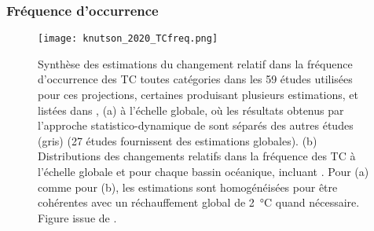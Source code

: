 \documentclass[../main.tex]{subfiles}
\begin{document}
\subsubsection*{Fréquence d'occurrence}

\begin{figure}[htb]
    \centering
    \texttt{[image: knutson\_2020\_TCfreq.png]}
    \caption{Synthèse des estimations du changement relatif dans la fréquence d'occurrence des TC toutes catégories dans les \num{59} études utilisées pour ces
        projections, certaines produisant plusieurs estimations, et listées dans \cite[][documents supplémentaires, tableau ES1]{knutson_tropical_2020}, (a) à
        l'échelle globale, où les résultats obtenus par l'approche statistico-dynamique de \cite{emanuel_downscaling_2013} sont séparés des autres études (gris)
        (27 études fournissent des estimations globales). (b) Distributions des changements relatifs dans la fréquence des TC à l'échelle globale et pour chaque
        bassin océanique, incluant \cite{emanuel_downscaling_2013}. Pour (a) comme pour (b), les estimations sont homogénéisées pour être cohérentes avec un
        réchauffement global de \SI{2}{\degreeCelsius} quand nécessaire. Figure issue de \cite{knutson_tropical_2020}.}
    \label{fig:TC_freq_summary}
\end{figure}
\end{document}

